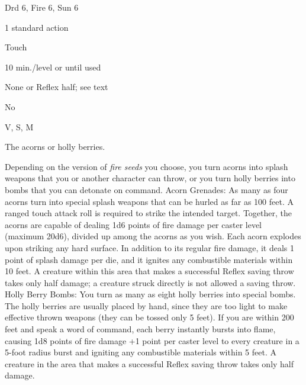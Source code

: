 
\begin{description*}
\item[Level:] Drd 6, Fire 6, Sun 6
\item[Casting Time:] 1 standard action
\item[Range:] Touch
\item[Duration:] 10 min./level or until used
\item[Saving Throw:] None or Reflex half; see text
\item[Spell Resistance:] No
\item[Components:] V, S, M
\item[Arcane Material Component:] The acorns or holly berries.
\end{description*}

Depending on the version of \textit{fire seeds} you choose, you turn acorns into
splash weapons that you or another character can throw, or you turn holly berries
into bombs that you can detonate on command.
Acorn Grenades: As many as four acorns turn into special splash weapons
that can be hurled as far as 100 feet. A ranged touch attack roll is required to
strike the intended target. Together, the acorns are capable of dealing 1d6 points
of fire damage per caster level (maximum 20d6), divided up among the acorns as
you wish.
Each acorn explodes upon striking any hard surface. In addition to its regular
fire damage, it deals 1 point of splash damage per die, and it ignites any combustible
materials within 10 feet. A creature within this area that makes a successful Reflex
saving throw takes only half damage; a creature struck directly is not allowed
a saving throw.
Holly Berry Bombs: You turn as many as eight holly berries into special
bombs. The holly berries are usually placed by hand, since they are too light to
make effective thrown weapons (they can be tossed only 5 feet). If you are within
200 feet and speak a word of command, each berry instantly bursts into flame, causing
1d8 points of fire damage +1 point per caster level to every creature in a 5-foot
radius burst and igniting any combustible materials within 5 feet. A creature in
the area that makes a successful Reflex saving throw takes only half damage.
